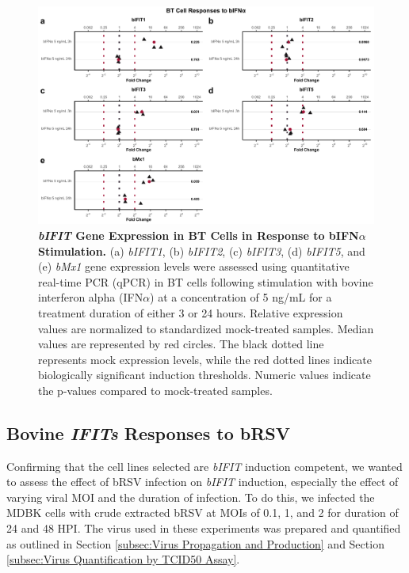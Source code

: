 \begin{figure}
    \centering
    \includegraphics[width=1\linewidth]{07. Chapter 2/Figs/02. Induction/08. bt_bifna.pdf}
    \caption[\textit{bIFIT} Gene Expression in BT Cells in Response to bIFN\(\alpha\) Stimulation.]{\textbf{\textit{bIFIT} Gene Expression in BT Cells in Response to bIFN\(\alpha\) Stimulation.} (a) \textit{bIFIT1}, (b) \textit{bIFIT2}, (c) \textit{bIFIT3}, (d) \textit{bIFIT5}, and (e) \textit{bMx1} gene expression levels were assessed using quantitative real-time PCR (qPCR) in BT cells following stimulation with bovine interferon alpha (IFN\(\alpha\)) at a concentration of 5 ng/mL for a treatment duration of either 3 or 24 hours. Relative expression values are normalized to standardized mock-treated samples. Median values are represented by red circles. The black dotted line represents mock expression levels, while the red dotted lines indicate biologically significant induction thresholds. Numeric values indicate the p-values compared to mock-treated samples.}
    \label{fig:BT responses to bifna}
\end{figure}

\subsection{Bovine \textit{IFITs} Responses to bRSV} \label{subsec:Bovine IFITs Responses to bRSV}
Confirming that the cell lines selected are \textit{bIFIT} induction competent, we wanted to assess the effect of bRSV infection on \textit{bIFIT} induction, especially the effect of varying viral MOI and the duration of infection. To do this, we infected the MDBK cells with crude extracted bRSV at MOIs of 0.1, 1, and 2 for duration of 24 and 48 HPI. The virus used in these experiments was prepared and quantified as outlined in Section \ref{subsec:Virus Propagation and Production} and Section \ref{subsec:Virus Quantification by TCID50 Assay}. 

